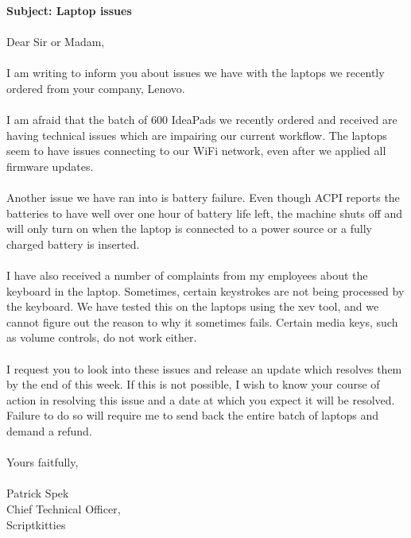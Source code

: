 \documentclass[11pt,english]{article}
\begin{document}
  \textbf{Subject: Laptop issues}

  \paragraph{}
  Dear Sir or Madam,
\\ \\
  I am writing to inform you about issues we have with the laptops we recently
  ordered from your company, Lenovo.
\\ \\ 
  I am afraid that the batch of 600 IdeaPads we recently ordered and received
  are having technical issues which are impairing our current workflow. The
  laptops seem to have issues connecting to our WiFi network, even after we
  applied all firmware updates.
\\ \\
  Another issue we have ran into is battery failure. Even though ACPI reports
  the batteries to have well over one hour of battery life left, the machine
  shuts off and will only turn on when the laptop is connected to a power source
  or a fully charged battery is inserted.
\\ \\
  I have also received a number of complaints from my employees about the
  keyboard in the laptop. Sometimes, certain keystrokes are not being processed
  by the keyboard. We have tested this on the laptops using the xev tool, and we
  cannot figure out the reason to why it sometimes fails. Certain media keys,
  such as volume controls, do not work either.
\\ \\
  I request you to look into these issues and release an update which resolves
  them by the end of this week. If this is not possible, I wish to know your
  course of action in resolving this issue and a date at which you expect it will
  be resolved. Failure to do so will require me to send back the entire batch of
  laptops and demand a refund.

  \paragraph{}
  Yours faitfully,
  \\ \\
  Patrick Spek \\
  Chief Technical Officer, \\
  Scriptkitties
\end{document}
